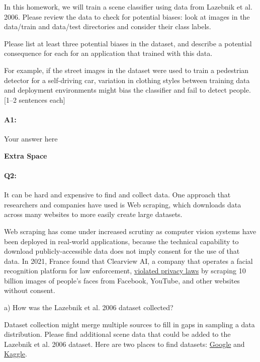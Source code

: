 In this homework, we will train a scene classifier using data from Lazebnik et al. 2006. Please review the data to check for potential biases: look at images in the data/train and data/test directories and consider their class labels. 

Please list at least three potential biases in the dataset, and describe a potential consequence for each for an application that trained with this data.

For example, if the street images in the dataset were used to train a pedestrian detector for a self-driving car, variation in clothing styles between training data and deployment environments might bias the classifier and fail to detect people. [1--2 sentences each]

\paragraph{A1:} Your answer here

\pagebreak

\textbf{Extra Space}

\pagebreak
 
\paragraph{Q2:}  It can be hard and expensive to find and collect data. One approach that researchers and companies have used is Web scraping, which downloads data across many websites to more easily create large datasets.

Web scraping has come under increased scrutiny as computer vision systems have been deployed in real-world applications, because the technical capability to download publicly-accessible data does not imply consent for the use of that data. In 2021, France found that Clearview AI, a company that operates a facial recognition platform for law enforcement, \href{https://techcrunch.com/2021/12/16/clearview-gdpr-breaches-france/}{violated privacy laws} by scraping 10 billion images of people's faces from Facebook, YouTube, and other websites without consent.

a) How was the Lazebnik et al. 2006 dataset collected?

Dataset collection might merge multiple sources to fill in gaps in sampling a data distribution. Please find additional scene data that could be added to the Lazebnik et al. 2006 dataset. Here are two places to find datasets: \href{https://datasetsearch.research.google.com}{Google} and \href{https://www.kaggle.com}{Kaggle}. 

